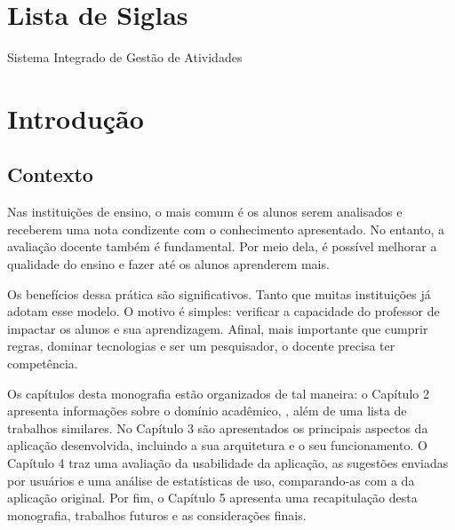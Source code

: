 \documentclass[12pt, a4paper]{report}
\begin{document}
\listoftables
\cleardoublepage

\chapter*{Lista de Siglas}

\begin{acronym}
 {Sistema Integrado de Gestão de Atividades} 
\end{acronym}


\chapter{Introdução}
\section{Contexto}
Nas instituições de ensino, o mais comum é os alunos serem analisados e receberem uma nota condizente com o conhecimento apresentado. No entanto, a avaliação docente também é fundamental. Por meio dela, é possível melhorar a qualidade do ensino e fazer até os alunos aprenderem mais.

Os benefícios dessa prática são significativos. Tanto que muitas instituições já adotam esse modelo. O motivo é simples: verificar a capacidade do professor de impactar os alunos e sua aprendizagem. Afinal, mais importante que cumprir regras, dominar tecnologias e ser um pesquisador, o docente precisa ter competência.


Os capítulos desta monografia estão organizados de tal maneira: o Capítulo 2 apresenta informações sobre o domínio acadêmico, , além de uma lista de trabalhos similares. No Capítulo 3 são apresentados os principais aspectos da aplicação desenvolvida, incluindo a sua arquitetura e o seu funcionamento. O Capítulo 4 traz uma avaliação da usabilidade da aplicação, as sugestões enviadas por usuários e uma análise de estatísticas de uso, comparando-as com a da aplicação original. Por fim, o Capítulo 5 apresenta uma recapitulação desta monografia, trabalhos futuros e as considerações finais.
\end{document}
